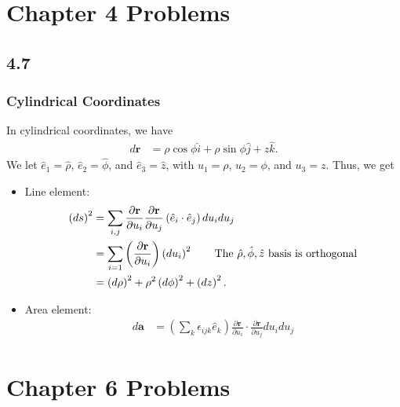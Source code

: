 \documentclass[10pt]{mypackage}
\begin{document}
\RaggedRight

\section{Chapter 4 Problems}%
\subsection{4.7}%
\subsubsection{Cylindrical Coordinates}%
In cylindrical coordinates, we have
\begin{align*}
  d\mathbf{r} &= \rho \cos \phi \hat{i} + \rho \sin\phi \hat{j} + z\hat{k}.
\end{align*}
We let $\hat{e}_1 = \hat{\rho}$, $\hat{e}_2 = \hat{\phi}$, and $\hat{e}_3 = \hat{z}$, with $u_1 = \rho$, $u_2 = \phi$, and $u_3 = z$. Thus, we get
\begin{itemize}
  \item Line element:
    \begin{align*}
      \left(ds\right)^2 &= \sum_{i,j} \frac{\partial \mathbf{r}}{\partial u_i} \frac{\partial \mathbf{r}}{\partial u_j}\left(\hat{e}_i \cdot \hat{e}_j\right) du_idu_j\\
                        &= \sum_{i=1}\left(\frac{\partial \mathbf{r}}{\partial u_i}\right) \left(du_i\right)^2\tag*{The $\hat{\rho},\hat{\phi},\hat z$ basis is orthogonal}\\
                        &= \left(d\rho\right)^2 + \rho^2 \left(d\phi\right)^2 + \left(dz\right)^2.
    \end{align*}
  \item Area element:
    \begin{align*}
      d\mathbf{a} &= \left(\sum_{k}\epsilon_{ijk}\hat{e}_k\right)\frac{\partial \mathbf{r}}{\partial u_i}\cdot\frac{\partial \mathbf{r}}{\partial u_j} du_i du_j
    \end{align*}
\end{itemize}
\section{Chapter 6 Problems}%
\end{document}
